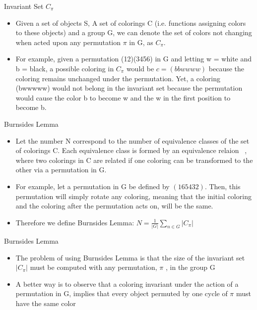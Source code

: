 \documentclass{beamer}
\begin{document}
\begin{frame}{Invariant Set $C_{\pi}$}
\begin{itemize}
\item Given a set of objects S, A set of colorings C (i.e. functions assigning colors to these objects) and a group G, we can denote the set of colors not changing when acted upon any permutation ${\pi}$ in G, as $C_{\pi}$.
\item For example, given a permutation (12)(3456) in G and letting w = white and b = black, a possible coloring in $C_{\pi}$ would be $c =(bbwwww)$ because the coloring remains unchanged under the permutation. Yet, a coloring (bwwwww) would not belong in the invariant set because the permutation would cause the color b to become w and the w in the first position to become b.
\end{itemize}
\end{frame}
%
%
\begin{frame}{Burnsides Lemma}
\begin{itemize}
\item Let the number N correspond to the number of equivalence classes of the set of colorings C. Each equivalence class is formed by an equivalence relaion ~, where two colorings in C are related if one coloring can be  transformed to the other via a permutation in G.
\item For example, let a permutation in G be defined by $(165432)$. Then, this permutation will simply rotate any coloring, meaning that the initial coloring and the coloring after the permutation acts on, will be the same.
\item Therefore we define Burnsides Lemma: $N=\frac{1}{\vert G\vert}{\displaystyle \sum_{n\in G}\vert C_{\pi}\vert}$
\end{itemize}
\end{frame}
%
%
\begin{frame}{Burnsides Lemma}
\begin{itemize}
\item The problem of using Burnsides Lemma is that the size of the invariant set $\vert C_{\pi}\vert$ must be computed with any permutation, $\pi$ , in the group G
\item A better way is to observe that a coloring invariant under the action of a permutation in G, implies that every object permuted by one cycle of $\pi$ must have the same color
\end{itemize}
\end{frame}
%
%
\end{document}
